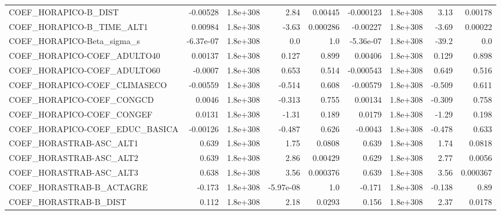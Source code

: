 \begin{tabular}{lrrrrrrrr}
COEF\_HORAPICO-B\_DIST              &    -0.00528 &     1.8e+308 &      2.84 &  0.00445 &  -0.000123 &    1.8e+308 &         3.13 &       0.00178 \\
COEF\_HORAPICO-B\_TIME\_ALT1         &     0.00984 &     1.8e+308 &     -3.63 & 0.000286 &   -0.00227 &    1.8e+308 &        -3.69 &       0.00022 \\
COEF\_HORAPICO-Beta\_sigma\_s        &   -6.37e-07 &     1.8e+308 &       0.0 &      1.0 &  -5.36e-07 &    1.8e+308 &        -39.2 &           0.0 \\
COEF\_HORAPICO-COEF\_ADULTO40       &     0.00137 &     1.8e+308 &     0.127 &    0.899 &    0.00406 &    1.8e+308 &        0.129 &         0.898 \\
COEF\_HORAPICO-COEF\_ADULTO60       &     -0.0007 &     1.8e+308 &     0.653 &    0.514 &  -0.000543 &    1.8e+308 &        0.649 &         0.516 \\
COEF\_HORAPICO-COEF\_CLIMASECO      &    -0.00559 &     1.8e+308 &    -0.514 &    0.608 &   -0.00579 &    1.8e+308 &       -0.509 &         0.611 \\
COEF\_HORAPICO-COEF\_CONGCD         &      0.0046 &     1.8e+308 &    -0.313 &    0.755 &    0.00134 &    1.8e+308 &       -0.309 &         0.758 \\
COEF\_HORAPICO-COEF\_CONGEF         &      0.0131 &     1.8e+308 &     -1.31 &    0.189 &     0.0179 &    1.8e+308 &        -1.29 &         0.198 \\
COEF\_HORAPICO-COEF\_EDUC\_BASICA    &    -0.00126 &     1.8e+308 &    -0.487 &    0.626 &    -0.0043 &    1.8e+308 &       -0.478 &         0.633 \\
COEF\_HORASTRAB-ASC\_ALT1           &       0.639 &     1.8e+308 &      1.75 &   0.0808 &      0.639 &    1.8e+308 &         1.74 &        0.0818 \\
COEF\_HORASTRAB-ASC\_ALT2           &       0.639 &     1.8e+308 &      2.86 &  0.00429 &      0.629 &    1.8e+308 &         2.77 &        0.0056 \\
COEF\_HORASTRAB-ASC\_ALT3           &       0.638 &     1.8e+308 &      3.56 & 0.000376 &      0.639 &    1.8e+308 &         3.56 &      0.000367 \\
COEF\_HORASTRAB-B\_ACTAGRE          &      -0.173 &     1.8e+308 & -5.97e-08 &      1.0 &     -0.171 &    1.8e+308 &       -0.138 &          0.89 \\
COEF\_HORASTRAB-B\_DIST             &       0.112 &     1.8e+308 &      2.18 &   0.0293 &      0.156 &    1.8e+308 &         2.37 &        0.0178 \\

\end{tabular}
